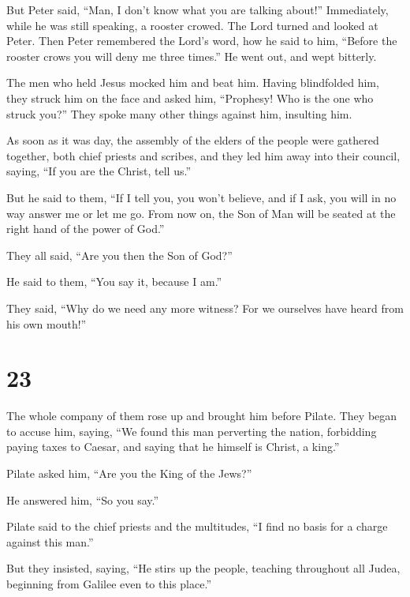  But Peter said, ``Man, I don't know what you are talking
about!'' Immediately, while he was still speaking, a rooster crowed.
 The Lord turned and looked at Peter. Then Peter remembered
the Lord's word, how he said to him, ``Before the rooster crows you will
deny me three times.''  He went out, and wept bitterly.

 The men who held Jesus mocked him and beat him.
 Having blindfolded him, they struck him on the face and
asked him, ``Prophesy! Who is the one who struck you?'' 
They spoke many other things against him, insulting him.

 As soon as it was day, the assembly of the elders of the
people were gathered together, both chief priests and scribes, and they
led him away into their council, saying,  ``If you are the
Christ, tell us.''

But he said to them, ``If I tell you, you won't believe, 
and if I ask, you will in no way answer me or let me go. 
From now on, the Son of Man will be seated at the right hand of the
power of God.''

 They all said, ``Are you then the Son of God?''

He said to them, ``You say it, because I am.''

 They said, ``Why do we need any more witness? For we
ourselves have heard from his own mouth!''

\hypertarget{section-22}{%
\section{23}\label{section-22}}

 The whole company of them rose up and brought him before
Pilate.  They began to accuse him, saying, ``We found this
man perverting the nation, forbidding paying taxes to Caesar, and saying
that he himself is Christ, a king.''

 Pilate asked him, ``Are you the King of the Jews?''

He answered him, ``So you say.''

 Pilate said to the chief priests and the multitudes, ``I
find no basis for a charge against this man.''

 But they insisted, saying, ``He stirs up the people,
teaching throughout all Judea, beginning from Galilee even to this
place.''

